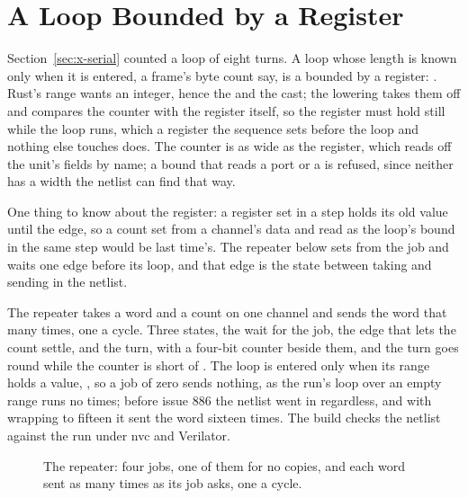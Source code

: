 \section{A Loop Bounded by a Register}
\label{sec:x-repeat}

Section~\ref{sec:x-serial} counted a loop of eight turns. A loop
whose length is known only when it is entered, a frame's byte count
say, is a  bounded by a register:
. Rust's range
wants an integer, hence the  and the cast; the lowering
takes them off and compares the counter with the register itself, so
the register must hold still while the loop runs, which a register
the sequence sets before the loop and nothing else touches does. The
counter is as wide as the register, which  reads off
the unit's fields by name; a bound that reads a port or a 
is refused, since neither has a width the netlist can find that way.

One thing to know about the register: a register set in a step holds
its old value until the edge, so a count set from a channel's data
and read as the loop's bound in the same step would be last time's.
The repeater below sets  from the job and waits one edge
before its loop, and that edge is the state between taking and
sending in the netlist.

The repeater takes a word and a count on one channel and sends the
word that many times, one a cycle. Three states, the wait for the
job, the edge that lets the count settle, and the turn, with a
four-bit counter beside them, and the turn goes round while the
counter is short of . The loop is entered only when
its range holds a value, , so a job of zero sends
nothing, as the run's loop over an empty range runs no times; before
issue 886 the netlist went in regardless, and with 
wrapping to fifteen it sent the word sixteen times. The build checks
the netlist against the run under nvc and Verilator.

\begin{figure}[htbp]
\centering

\caption{The repeater: four jobs, one of them for no copies, and each
word sent as many times as its job asks, one a cycle.}
\label{fig:x-repeat}
\end{figure}




